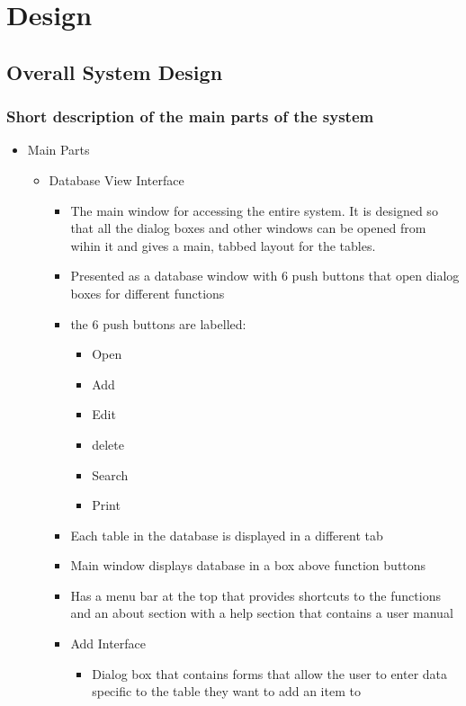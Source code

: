  \chapter{Design}

\section{Overall System Design}

\subsection{Short description of the main parts of the system}

\begin {itemize}
	\item Main Parts
	\begin {itemize}
		\item Database View Interface
		\begin {itemize}
		    \item The main window for accessing the entire system. It is designed so that all the dialog boxes and other windows can be opened from wihin it and gives a main, tabbed layout for the tables.
			\item Presented as a database window with 6 push buttons that open dialog boxes for different functions
			\item the 6 push buttons are labelled:
			\begin {itemize}
				\item Open
				\item Add
				\item Edit
				\item delete
				\item Search
				\item Print
			\end {itemize}
		\item Each table in the database is displayed in a different tab
		\item Main window displays database in a box above function buttons
		\item Has a menu bar at the top that provides shortcuts to the functions and an about section with a help section that contains   a user manual
	\item Add Interface
	\begin {itemize}
	    \item Dialog box that contains forms that allow the user to enter data specific to the table they want to add an item to 

\end{itemize}
\end{itemize}
\end{itemize}
\end{itemize}
